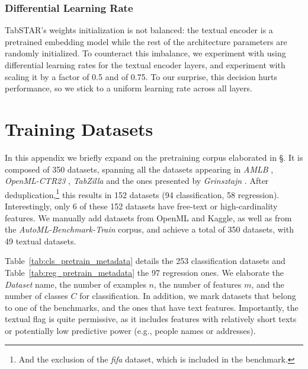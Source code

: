 \subsubsection{Differential Learning Rate}\label{app:exp_lr}

TabSTAR's weights initialization is not balanced: the textual encoder is a pretrained embedding model while the rest of the architecture parameters are randomly initialized. To counteract this imbalance, we experiment with using differential learning rates for the textual encoder layers, and experiment with scaling it by a factor of 0.5 and of 0.75. To our surprise, this decision hurts performance, so we stick to a uniform learning rate across all layers.


\section{Training Datasets}
\label{app:train_datasets}

In this appendix we briefly expand on the pretraining corpus elaborated in \S{}. It is composed of 350 datasets, spanning all the datasets appearing in \textit{AMLB} \cite{gijsbers_amlb_2024}, \textit{OpenML-CTR23} \cite{fischer_openml-ctr23_2023}, \textit{TabZilla} \cite{mcelfresh_when_2023} and the ones presented by \textit{Grinsztajn} \cite{grinsztajn_why_2022}. After deduplication,\footnote{And the exclusion of the \textit{fifa} dataset, which is included in the benchmark.} this results in 152 datasets (94 classification, 58 regression). Interestingly, only 6 of these 152 datasets have free-text or high-cardinality features. We manually add datasets from OpenML \cite{vanschoren_openml_2014} and Kaggle, as well as from the \textit{AutoML-Benchmark-Train} \cite{feurer_auto-sklearn_2022} corpus, and achieve a total of 350 datasets, with 49 textual datasets.

Table~\ref{tab:cls_pretrain_metadata} details the 253 classification datasets and Table~\ref{tab:reg_pretrain_metadata} the 97 regression ones. We elaborate the \textit{Dataset} name, the number of examples $n$, the number of features $m$, and the number of classes $C$ for classification. In addition, we mark datasets that belong to one of the benchmarks, and the ones that have text features. Importantly, the textual flag is quite permissive, as it includes features with relatively short texts or potentially low predictive power (e.g., people names or addresses).


